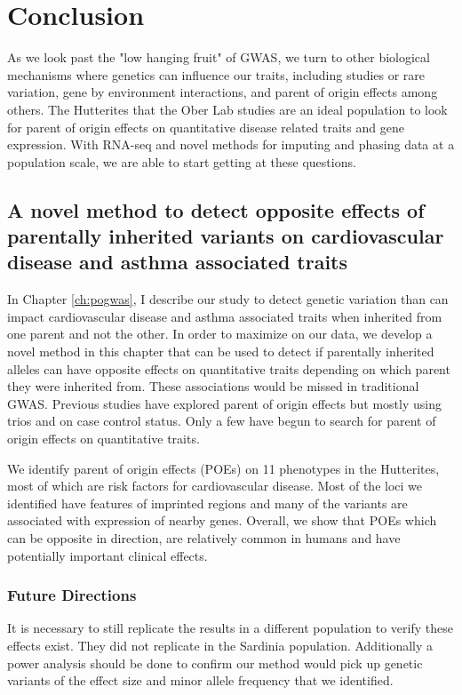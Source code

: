 \chapter{Conclusion}

As we look past the "low hanging fruit" of GWAS, we turn to other biological mechanisms where genetics can influence our traits, including studies or rare variation\cite{Igartua:2017ir}, gene by environment interactions, and parent of origin effects among others. The Hutterites that the Ober Lab studies are an ideal population to look for parent of origin effects on quantitative disease related traits and gene expression\cite{Weiss:2005cq,Abney2001,Ober:2001dy}. With RNA-seq and novel methods for imputing and phasing data at a population scale\citep{Livne2015}, we are able to start getting at these questions. 


\section{A novel method to detect opposite effects of parentally inherited variants on cardiovascular disease and asthma associated traits}
 
 In Chapter \ref{ch:pogwas}, I describe our study to detect genetic variation than can impact cardiovascular disease and asthma associated traits when inherited from one parent and not the other. In order to maximize on our data, we develop a novel method in this chapter that can be used to detect if parentally inherited alleles can have opposite effects on quantitative traits depending on which parent they were inherited from. These associations would be missed in traditional GWAS. Previous studies have explored parent of origin effects but mostly using trios\cite{Garg2012a,Ainsworth:2010bp,Howey:2012hj} and on case control status\cite{Kong:2009kk,Ainsworth:2010bp}. Only a few have begun to search for parent of origin effects on quantitative traits\cite{Benonisdottir:2016dz,Zoledziewska:2015do}.
 
 We identify parent of origin effects (POEs) on 11 phenotypes in the Hutterites, most of which are risk factors for cardiovascular disease. Most of the loci we identified have features of imprinted regions and many of the variants are associated with expression of nearby genes. Overall, we show that POEs which can be opposite in direction, are relatively common in humans and have potentially important clinical effects. 
 
 \subsection{Future Directions}
It is necessary to still replicate the results in a different population to verify these effects exist. They did not replicate in the Sardinia population. Additionally a power analysis should be done to confirm our method would pick up genetic variants of the effect size and minor allele frequency that we identified.

